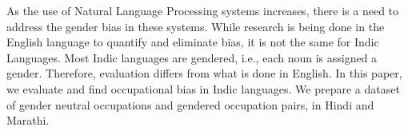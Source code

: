 As the use of Natural Language Processing systems increases, there is a need to address the gender bias in these systems. While research is being done in the English language to quantify and eliminate bias, it is not the same for Indic Languages. Most Indic languages are gendered, i.e., each noun is assigned a gender. Therefore, evaluation differs from what is done in English. In this paper, we evaluate and find occupational bias in Indic languages. We prepare a dataset of gender neutral occupations and gendered occupation pairs, in Hindi and Marathi.
